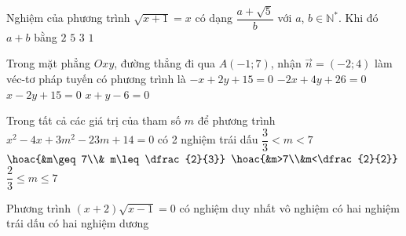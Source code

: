 \begin{ex}%
	Nghiệm của phương trình $\sqrt{x + 1} = x$ có dạng $\dfrac{a+\sqrt{5}}{b}$ với $a$, $b \in \mathbb{N}^{*}$. Khi đó $a+b$ bằng
	\choice
	{$2$}
	{$5$}	
	{\True $3$}
	{$1$}
\end{ex}

\begin{ex}%
	Trong mặt phẳng $Oxy$, đường thẳng đi qua $A(-1;7)$, nhận $\overrightarrow{n}=(-2;4)$ làm véc-tơ pháp tuyến có phương trình là
	\choice
	{$-x+2y+15=0$}
	{$-2x+4y+26=0$}
	{\True $x-2y+15=0$}
	{$x+y-6=0$}
\end{ex}

\begin{ex}%
	Trong tất cả các giá trị của tham số $m$ để phương trình $x^2 - 4x + 3m^2 -23m +14=0$ có 2 nghiệm trái dấu
	\choice
	{\True $\dfrac{3}{3} < m < 7$}
	{$\hoac{&m\geq 7\\& m\leq \dfrac{2}{3}}$}
	{$\hoac{&m>7\\&m<\dfrac{2}{2}}$}
	{$\dfrac{2}{3}\leq m \leq 7$}
\end{ex}

\begin{ex}%
	Phương trình $(x+2)\sqrt{x-1}=0$
	\choice
	{\True có nghiệm duy nhất}
	{vô nghiệm}
	{có hai nghiệm trái dấu}
	{có hai nghiệm dương}
\end{ex}


